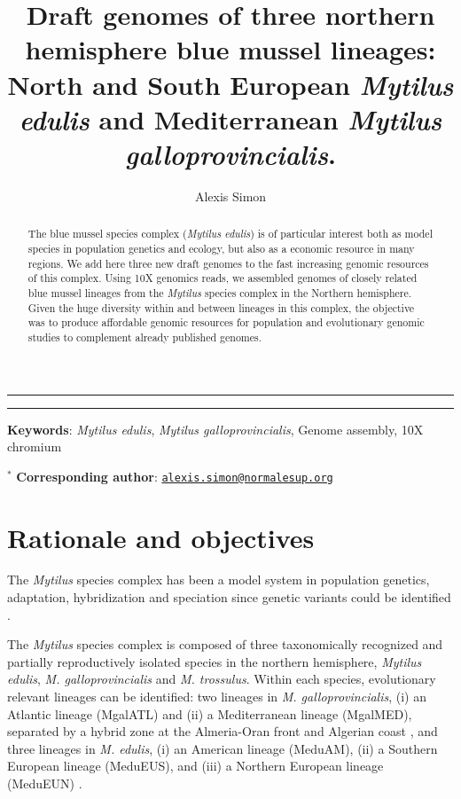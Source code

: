 \documentclass[11pt, a4paper]{article}
\title{Draft genomes of three northern hemisphere blue mussel lineages: North and South European \emph{Mytilus edulis} and Mediterranean \emph{Mytilus galloprovincialis}.}
\author[1,2,*]{Alexis Simon}
\affil[1]{ISEM, EPHE, IRD, Université Montpellier, Montpellier, France}
\affil[2]{Center of Population Biology and Department of Evolution and Ecology, University of California Davis, Davis, California, USA}
\begin{document}
\maketitle


\vspace{1cm}
\hrule
\begin{abstract}
    The blue mussel species complex (\textit{Mytilus edulis}) is of particular interest both as model species in population genetics and ecology,
    but also as a economic resource in many regions.
    We add here three new draft genomes to the fast increasing genomic resources of this complex.
	Using 10X genomics reads, we assembled genomes of closely related blue mussel lineages from the \emph{Mytilus} species complex in the Northern hemisphere.
	Given the huge diversity within and between lineages in this complex, 
	the objective was to produce affordable genomic resources for population and evolutionary genomic studies to complement already published genomes.
\end{abstract}

\vspace{3mm}
\hrule
\vspace{5mm}

\noindent
\textbf{Keywords}: \emph{Mytilus edulis}, \emph{Mytilus galloprovincialis}, Genome assembly, 10X chromium

\noindent
$^{*}$ \textbf{Corresponding author}: \href{mailto:alexis.simon@normalesup.org}{\nolinkurl{alexis.simon@normalesup.org}}

\newpage

\section{Rationale and objectives}\label{introduction}

The \textit{Mytilus} species complex has been a model system in population genetics, adaptation, hybridization and speciation since genetic variants could be identified \parencite{Milkman1970, Koehn1972, Ahmad1977, Skibinski1978, Quesada1995b, Bierne2003, Fraisse2016a, Simon2021}.

The \textit{Mytilus} species complex is composed of three taxonomically recognized and partially reproductively isolated species in the northern hemisphere,
\textit{Mytilus edulis}, \textit{M. galloprovincialis} and \textit{M. trossulus}.
Within each species, evolutionary relevant lineages can be identified:
two lineages in \textit{M. galloprovincialis}, (i)  an Atlantic lineage (MgalATL) and (ii) a Mediterranean lineage (MgalMED), separated by a hybrid zone at the Almeria-Oran front and Algerian coast \parencite{Quesada1995, Fraisse2016a, ElAyari2019}, and
three lineages in \textit{M. edulis}, (i) an American lineage (MeduAM), (ii) a Southern European lineage (MeduEUS), and (iii) a Northern European lineage (MeduEUN) \parencite{Fraisse2016a, Simon2020}.
\end{document}

